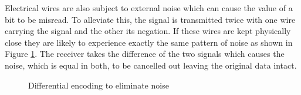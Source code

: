 			Electrical wires are also subject to external noise which can cause the
			value of a bit to be misread. To alleviate this, the signal is transmitted
			twice with one wire carrying the signal and the other its negation. If
			these wires are kept physically close they are likely to experience
			exactly the same pattern of noise as shown in Figure
			\ref{fig:differential-encoding}. The receiver takes the difference of the
			two signals which causes the noise, which is equal in both, to be
			cancelled out leaving the original data intact.
			
			\begin{figure}
				\center
				
				
				\caption{Differential encoding to eliminate noise}
				\label{fig:differential-encoding}
			\end{figure}
